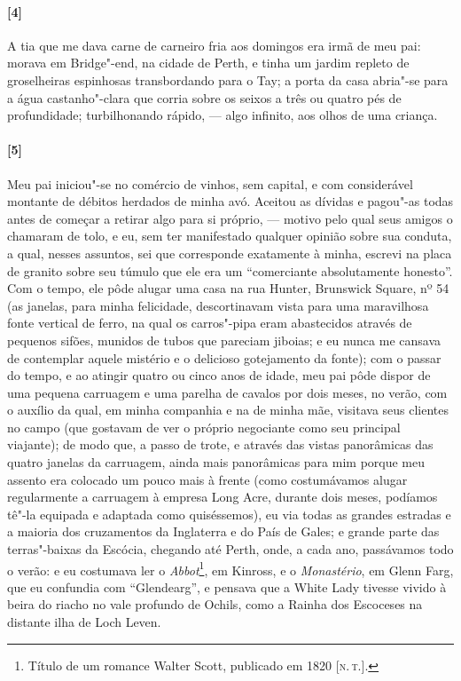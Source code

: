 \paragraph{[4]} A tia que me dava carne de carneiro fria aos domingos era irmã de meu
pai: morava em Bridge"-end, na cidade de Perth, e tinha um jardim repleto
de groselheiras espinhosas transbordando para o Tay; a porta da casa
abria"-se para a água castanho"-clara que corria sobre os seixos a três ou
quatro pés de profundidade; turbilhonando rápido, --- algo infinito, aos
olhos de uma criança.

\paragraph{[5]} Meu pai iniciou"-se no comércio de vinhos, sem capital, e com
considerável montante de débitos herdados de minha avó. Aceitou as
dívidas e pagou"-as todas antes de começar a retirar algo para si
próprio, --- motivo pelo qual seus amigos o chamaram de tolo, e eu, sem
ter manifestado qualquer opinião sobre sua conduta, a qual, nesses
assuntos, sei que corresponde exatamente à minha, escrevi na placa de
granito sobre seu túmulo que ele era um ``comerciante absolutamente
honesto''. Com o tempo, ele pôde alugar uma casa na rua Hunter,
Brunswick Square, nº 54 (as janelas, para minha felicidade,
descortinavam vista para uma maravilhosa fonte vertical de ferro, na
qual os carros"-pipa eram abastecidos através de pequenos sifões, munidos
de tubos que pareciam jiboias; e eu nunca me cansava de contemplar
aquele mistério e o delicioso gotejamento da fonte); com o passar do
tempo, e ao atingir quatro ou cinco anos de idade, meu pai pôde dispor
de uma pequena carruagem e uma parelha de cavalos por dois meses, no
verão, com o auxílio da qual, em minha companhia e na de minha mãe,
visitava seus clientes no campo (que gostavam de ver o próprio
negociante como seu principal viajante); de modo que, a passo de trote,
e através das vistas panorâmicas das quatro janelas da carruagem, ainda
mais panorâmicas para mim porque meu assento era colocado um pouco mais
à frente (como costumávamos alugar regularmente a carruagem à empresa
Long Acre, durante dois meses, podíamos tê"-la equipada e adaptada como
quiséssemos), eu via todas as grandes estradas e a maioria dos
cruzamentos da Inglaterra e do País de Gales; e grande parte das
terras"-baixas da Escócia, chegando até Perth, onde, a cada ano,
passávamos todo o verão: e eu costumava ler o \emph{Abbot}\footnote{Título
  de um romance Walter Scott, publicado em 1820 {[}\textsc{n.\,t.}{]}.},
em Kinross, e o \emph{Monastério}, em Glenn Farg, que eu confundia com
``Glendearg'', e pensava que a White Lady tivesse vivido à beira do
riacho no vale profundo de Ochils, como a Rainha dos Escoceses na
distante ilha de Loch Leven.

